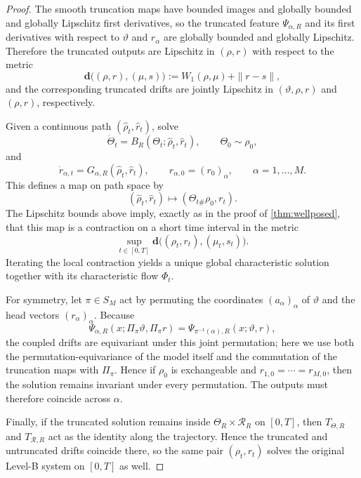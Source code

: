 \documentclass[11pt]{article}
\theoremstyle{definition}
\newcommand{\W}{W_1}
\begin{document}
\begin{proof}
The smooth truncation maps have bounded images and globally bounded and globally Lipschitz first derivatives, so the truncated feature $\Psi_{\alpha,R}$ and its first derivatives with respect to $\vartheta$ and $r_\alpha$ are globally bounded and globally Lipschitz.
Therefore the truncated outputs are Lipschitz in $(\rho,r)$ with respect to the metric
\[
  \mathbf d\bigl((\rho,r),(\mu,s)\bigr)
  :=
  \W(\rho,\mu)+\|r-s\|,
\]
and the corresponding truncated drifts are jointly Lipschitz in $(\vartheta,\rho,r)$ and $(\rho,r)$, respectively.

Given a continuous path $(\widehat\rho_t,\widehat r_t)$, solve
\[
  \dot \Theta_t = B_R(\Theta_t;\widehat\rho_t,\widehat r_t),
  \qquad
  \Theta_0\sim \rho_0,
\]
and
\[
  \dot r_{\alpha,t} = G_{\alpha,R}(\widehat\rho_t,\widehat r_t),
  \qquad
  r_{\alpha,0}=(r_0)_\alpha,
  \qquad
  \alpha=1,\dots,M.
\]
This defines a map on path space by
\[
  (\widehat\rho_t,\widehat r_t)
  \mapsto
  (\Theta_{t\#}\rho_0,r_t).
\]
The Lipschitz bounds above imply, exactly as in the proof of \cref{thm:wellposed}, that this map is a contraction on a short time interval in the metric
\[
  \sup_{t\in[0,T]}
  \mathbf d\bigl((\rho_t,r_t),(\mu_t,s_t)\bigr).
\]
Iterating the local contraction yields a unique global characteristic solution together with its characteristic flow $\Phi_t$.

For symmetry, let $\pi\in S_M$ act by permuting the coordinates $(a_\alpha)_\alpha$ of $\vartheta$ and the head vectors $(r_\alpha)_\alpha$.
Because
\[
  \Psi_{\alpha,R}(x;\Pi_\pi \vartheta,\Pi_\pi r)
  =
  \Psi_{\pi^{-1}(\alpha),R}(x;\vartheta,r),
\]
the coupled drifts are equivariant under this joint permutation;
here we use both the permutation-equivariance of the model itself and the commutation of the truncation maps with $\Pi_\pi$.
Hence if $\rho_0$ is exchangeable and $r_{1,0}=\cdots=r_{M,0}$, then the solution remains invariant under every permutation.
The outputs must therefore coincide across $\alpha$.

Finally, if the truncated solution remains inside $\Theta_R\times \mathcal R_R$ on $[0,T]$, then $T_{\Theta,R}$ and $T_{\mathcal R,R}$ act as the identity along the trajectory.
Hence the truncated and untruncated drifts coincide there, so the same pair $(\rho_t,r_t)$ solves the original Level-B system on $[0,T]$ as well.
\end{proof}
\end{document}
